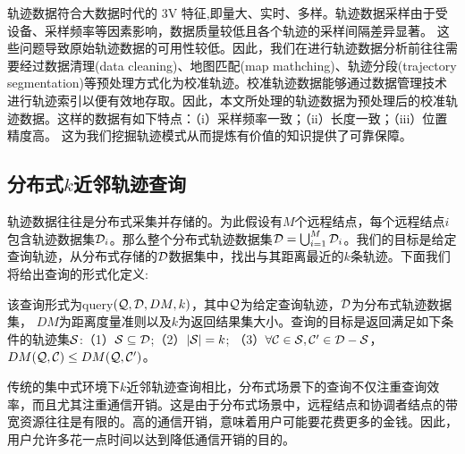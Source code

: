 轨迹数据符合大数据时代的 3V 特征,即量大、实时、多样。轨迹数据采样由于受设备、采样频率等因素影响，数据质量较低且各个轨迹的采样间隔差异显著。
这些问题导致原始轨迹数据的可用性较低。因此，我们在进行轨迹数据分析前往往需要经过数据清理(data cleaning)、地图匹配(map mathching)、轨迹分段(trajectory segmentation)等预处理方式化为校准轨迹。校准轨迹数据能够通过数据管理技术进行轨迹索引以便有效地存取。因此，本文所处理的轨迹数据为预处理后的校准轨迹数据。这样的数据有如下特点：（i）采样频率一致；（ii）长度一致；（iii）位置精度高。
这为我们挖掘轨迹模式从而提炼有价值的知识提供了可靠保障。

\subsection{分布式$k$近邻轨迹查询}
轨迹数据往往是分布式采集并存储的。为此假设有$M$个远程结点，每个远程结点$i$包含轨迹数据集${\cal D}_{i}$。那么整个分布式轨迹数据集${\cal D}=\bigcup_{i=1}^{M} {\cal D}_{i}$。我们的目标是给定查询轨迹，从分布式存储的${\cal D}$数据集中，找出与其距离最近的$k$条轨迹。下面我们将给出查询的形式化定义:
\begin{define}[分布式k近邻轨迹查询]
	该查询形式为query$({\cal Q}, {\cal D},DM,k)$，其中$\cal Q$为给定查询轨迹，${\cal D}$为分布式轨迹数据集， $DM$为距离度量准则以及$k$为返回结果集大小。查询的目标是返回满足如下条件的轨迹集$\cal S$:（1）${\cal S} \subseteq {\cal D}$;（2）$| {\cal S}|=k$;
	（3）$\forall {\cal C} \in {\cal S}, {\cal C}' \in {{\cal D} - \cal S}$，$DM({\cal Q},{\cal C}) \le DM({\cal Q},{\cal C}')$。
\end{define}


传统的集中式环境下$k$近邻轨迹查询相比，分布式场景下的查询不仅注重查询效率，而且尤其注重通信开销。这是由于分布式场景中，远程结点和协调者结点的带宽资源往往是有限的。高的通信开销，意味着用户可能要花费更多的金钱。因此，用户允许多花一点时间以达到降低通信开销的目的。


